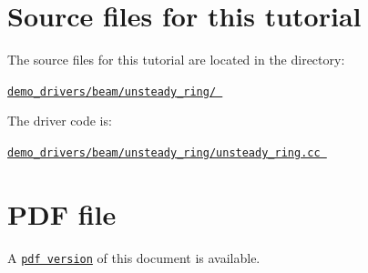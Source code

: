  

\hypertarget{index_sources}{}\section{Source files for this tutorial}\label{index_sources}

\begin{DoxyItemize}
\item The source files for this tutorial are located in the directory\+: \begin{center} \href{../../../../demo_drivers/beam/unsteady_ring/}{\tt demo\+\_\+drivers/beam/unsteady\+\_\+ring/ } \end{center} 
\item The driver code is\+: \begin{center} \href{../../../../demo_drivers/beam/unsteady_ring/unsteady_ring.cc}{\tt demo\+\_\+drivers/beam/unsteady\+\_\+ring/unsteady\+\_\+ring.\+cc } \end{center} 
\end{DoxyItemize}



 

 \hypertarget{index_pdf}{}\section{P\+D\+F file}\label{index_pdf}
A \href{../latex/refman.pdf}{\tt pdf version} of this document is available. 
